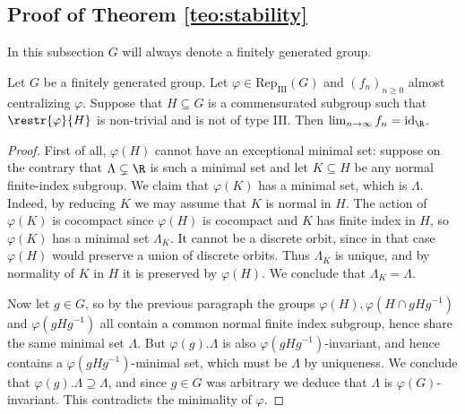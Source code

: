 \documentclass[reqno]{amsart}
\begin{document}
\subsection{Proof of Theorem \ref{teo:stability}} \label{subsection:stability}
In this subsection $G$ will always denote a finitely generated group.
\begin{lema} \label{lema:noIII} Let $G$ be a finitely generated group.
Let $\varphi \in \mathrm{Rep}_\mathrm{III}(G)$ and $(f_n)_{n \geq 0}$ almost centralizing $\varphi$.  Suppose that $H \subseteq G$ is a commensurated subgroup such that $\restr{\varphi}{H}$ is non-trivial and is not of type III. Then $\lim_{n \to \infty}f_n = \mathrm{id}_\R$.
\end{lema}
\begin{proof}
First of all, $\varphi(H)$ cannot have an exceptional minimal set: suppose on the contrary that $\Lambda \subsetneq \R$ is such a minimal set and let $K \subseteq H$ be any normal finite-index subgroup. We claim that $\varphi(K)$ has a minimal set, which is $\Lambda$. Indeed, by reducing $K$ we may assume that $K$ is normal in $H$. The action of $\varphi(K)$ is cocompact since $\varphi(H)$ is cocompact and $K$ has finite index in $H$, so $\varphi(K)$ has a minimal set $\Lambda_K$. It cannot be a discrete orbit, since in that case $\varphi(H)$ would preserve a union of discrete orbits. Thus $\Lambda_K$ is unique, and by normality of $K$ in $H$ it is preserved by $\varphi(H)$. We conclude that $\Lambda_K = \Lambda$.

Now let $g \in G$, so by the previous paragraph the groups $\varphi(H), \varphi(H \cap gHg^{-1})$ and $\varphi(gHg^{-1})$ all contain a common normal finite index subgroup, hence share the same minimal set $\Lambda$. But $\varphi(g).\Lambda$ is also $\varphi(gHg^{-1})$-invariant, and hence contains a $\varphi(gHg^{-1})$-minimal set, which must be $\Lambda$ by uniqueness. We conclude that $\varphi(g).\Lambda \supseteq \Lambda$, and since $g \in G$ was arbitrary we deduce that $\Lambda$ is $\varphi(G)$-invariant. This contradicts the minimality of $\varphi$.


\end{proof}
\end{document}
